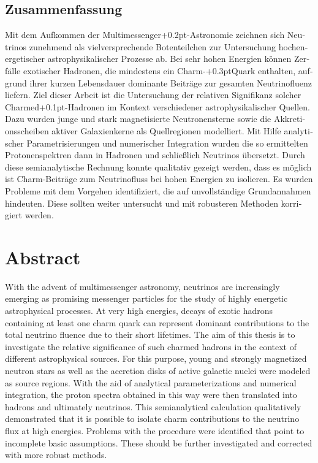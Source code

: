 \begin{otherlanguage}{ngerman}
	\chapter*{Zusammenfassung}

	Mit dem Aufkommen der Multimessenger{\kern+0.2pt}-Astronomie zeichnen sich Neutrinos zunehmend als vielversprechende
	Botenteilchen zur Untersuchung hochenergetischer astrophysikalischer Prozesse ab. Bei sehr hohen Energien können Zerfälle
	exotischer Hadronen, die mindestens ein Charm-{\kern+0.3pt}Quark enthalten, aufgrund ihrer kurzen Lebensdauer dominante
	Beiträge zur gesamten Neutrinofluenz liefern. Ziel dieser Arbeit ist die Untersuchung der relativen Signifikanz solcher
	Charmed{\kern+0.1pt}-Hadronen im Kontext verschiedener astrophysikalischer Quellen. Dazu wurden junge und stark
	magnetisierte Neutronensterne sowie die Akkretionsscheiben aktiver Galaxienkerne als Quellregionen modelliert.
	Mit Hilfe analytischer Parametrisierungen und numerischer Integration wurden die so ermittelten Protonenspektren
	dann in Hadronen und schließlich Neutrinos übersetzt. Durch diese semianalytische Rechnung konnte qualitativ gezeigt
	werden, dass es möglich ist Charm-Beiträge zum Neutrinofluss bei hohen Energien zu isolieren. Es wurden
	Probleme mit dem Vorgehen identifiziert, die auf unvollständige Grundannahmen hindeuten. Diese
	sollten weiter untersucht und mit robusteren Methoden korrigiert werden.

\end{otherlanguage}



{\let\clearpage\relax\chapter*{Abstract}\label{ch:abstract}}

With the advent of multimessenger astronomy, neutrinos are increasingly emerging as promising messenger particles for the
study of highly energetic astrophysical processes. At very high energies, decays of exotic hadrons containing at least one
charm quark can represent dominant contributions to the total neutrino fluence due to their short lifetimes. The aim of this
thesis is to investigate the relative significance of such charmed hadrons in the context of different astrophysical sources.
For this purpose, young and strongly magnetized neutron stars as well as the accretion disks of active galactic nuclei were
modeled as source regions. With the aid of analytical parameterizations and numerical integration, the proton spectra obtained
in this way were then translated into hadrons and ultimately neutrinos. This semianalytical calculation qualitatively
demonstrated that it is possible to isolate charm contributions to the neutrino flux at high energies. Problems
with the procedure were identified that point to incomplete basic assumptions. These should be
further investigated and corrected with more robust methods.

